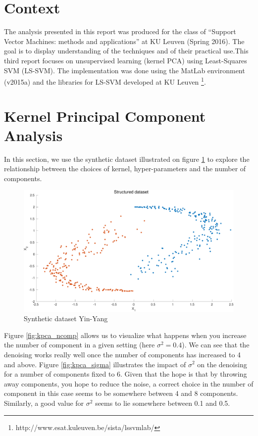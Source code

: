 \documentclass[11pt, a4paper]{article}
\begin{document}

\tableofcontents
\newpage

\section*{Context}

The analysis presented in this report was produced for the class of
``Support Vector Machines: methods and applications'' at KU Leuven
(Spring 2016). The goal is to display understanding of the techniques
and of their practical use.This third report focuses on unsupervised
learning (kernel PCA) using Least-Squares SVM (LS-SVM). The
implementation was done using the MatLab environment (v2015a) and the
libraries for LS-SVM developed at KU Leuven
\footnote{http://www.esat.kuleuven.be/sista/lssvmlab/}.

\section{Kernel Principal Component Analysis}

In this section, we use the synthetic dataset illustrated on figure
\ref{fig:kpca_dataset} to explore the relationship between the choices
of kernel, hyper-parameters and the number of components.

\begin{figure}[H]
  \centering
  \includegraphics[scale=.40]{kpca_dataset.pdf}
  \caption{Synthetic dataset Yin-Yang}
  \label{fig:kpca_dataset}
\end{figure}

Figure \ref{fig:kpca_ncomp} allows us to visualize what happens when
you increase the number of component in a given setting (here
$\sigma^2=0.4$). We can see that the denoising works really well once
the number of components has increased to 4 and above. Figure
\ref{fig:kpca_sigma} illustrates the impact of $\sigma^2$ on the
denoising for a number of components fixed to 6. Given that the hope
is that by throwing away components, you hope to reduce the noise, a
correct choice in the number of component in this case seems to be
somewhere between 4 and 8 components. Similarly, a good value for
$\sigma^2$ seems to lie somewhere between 0.1 and 0.5.
\end{document}
